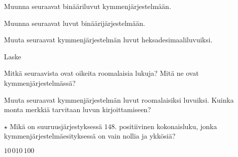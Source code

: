 \begin{tehtavasivu}

\begin{tehtava}
Muunna seuraavat binääriluvut kymmenjärjestelmään.
\begin{vastaus}
\end{vastaus}
\end{tehtava}

\begin{tehtava}
Muunna seuraavat luvut binäärijärjestelmään.
\begin{vastaus}
\end{vastaus}
\end{tehtava}

\begin{tehtava}
Muuta seuraavat kymmenjärjestelmän luvut heksadesimaaliluvuiksi.

\end{tehtava}

\begin{tehtava}
	Laske
	\begin{vastaus}
	\end{vastaus}
\end{tehtava}

\begin{tehtava}
Mitkä seuraavista ovat oikeita roomalaisia lukuja? Mitä ne ovat kymmenjärjestelmässä?
\begin{vastaus}
\end{vastaus}
\end{tehtava}

\begin{tehtava}
Muuta seuraavat kymmenjärjestelmän luvut roomalaisiksi luvuiksi. Kuinka monta merkkiä tarvitaan luvun kirjoittamiseen?
\begin{vastaus}
\end{vastaus}
\end{tehtava}

\begin{tehtava}
	$\star$ Mikä on suuruusjärjestyksessä $148$. positiivinen kokonaisluku, jonka kymmenjärjestelmäesityksessä on vain nollia ja ykkösiä?
	\begin{vastaus}
		$10\,010\,100$
	\end{vastaus}
\end{tehtava}

\end{tehtavasivu}
